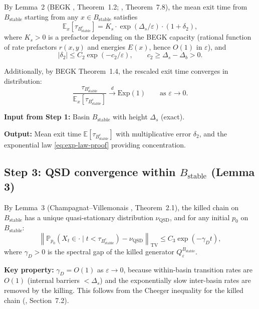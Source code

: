 \documentclass[11pt]{article}
\newcommand{\eps}{\varepsilon}
\newcommand{\Ds}{\Delta_s}
\newcommand{\Db}{\Delta_b}
\newcommand{\Bstable}{B_{\mathrm{stable}}}
\newcommand{\TV}{\mathrm{TV}}
\newcommand{\QSD}{\mathrm{QSD}}
\begin{document}
By Lemma~2 (BEGK \cite{BEGK02}, Theorem~1.2;
\cite{BdH15}, Theorem~7.8),
the mean exit time from $\Bstable$ starting from any $x \in \Bstable$
satisfies
\begin{equation}\label{eq:exit-time}
  \mathbb{E}_x[\tau_{\Bstable^c}]
  = K_s \cdot \exp(\Ds/\eps) \cdot (1 + \delta_2),
\end{equation}
where $K_s > 0$ is a prefactor depending on the BEGK capacity
(rational function of rate prefactors $r(x,y)$ and energies $E(x)$,
hence $O(1)$ in $\eps$), and
\[
  |\delta_2| \leq C_2 \exp(-c_2/\eps),
  \qquad c_2 \geq \Ds - \Db > 0.
\]

Additionally, by BEGK Theorem~1.4, the rescaled exit time converges
in distribution:
\begin{equation}\label{eq:exp-law-proof}
  \frac{\tau_{\Bstable^c}}{\mathbb{E}_x[\tau_{\Bstable^c}]}
  \xrightarrow{d} \mathrm{Exp}(1)
  \qquad \text{as } \eps \to 0.
\end{equation}

\textbf{Input from Step 1:} Basin $\Bstable$ with height $\Ds$ (exact).

\textbf{Output:} Mean exit time $\mathbb{E}[\tau_{\Bstable^c}]$
with multiplicative error $\delta_2$, and the exponential law
\eqref{eq:exp-law-proof} providing concentration.

\subsection*{Step 3: QSD convergence within $\Bstable$ (Lemma 3)}

By Lemma~3 (Champagnat--Villemonais \cite{CV16}, Theorem~2.1),
the killed chain on $\Bstable$ has a unique quasi-stationary
distribution $\nu_\QSD$, and for any initial $p_0$ on $\Bstable$:
\begin{equation}\label{eq:qsd-conv}
  \left\|\mathbb{P}_{p_0}(X_t \in \cdot \mid t < \tau_{\Bstable^c})
  - \nu_\QSD\right\|_\TV
  \leq C_3 \exp(-\gamma_D t),
\end{equation}
where $\gamma_D > 0$ is the spectral gap of the killed generator
$Q_\eps^{\Bstable}$.

\textbf{Key property:} $\gamma_D = O(1)$ as $\eps \to 0$,
because within-basin transition rates are $O(1)$ (internal barriers
$< \Ds$) and the exponentially slow inter-basin rates are removed
by the killing. This follows from the Cheeger inequality for the
killed chain (\cite{BdH15}, Section~7.2).
\end{document}
